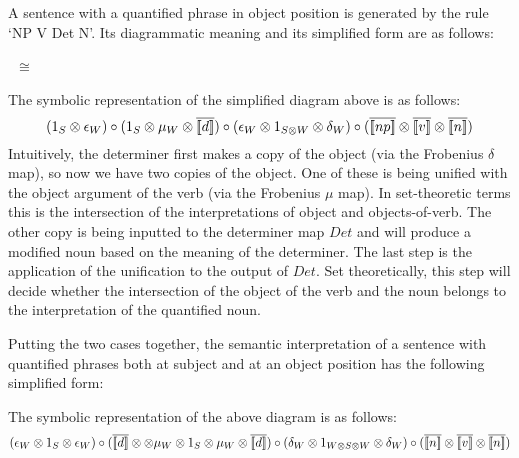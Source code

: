 A sentence with a  quantified phrase in  object position is generated by the rule   `NP V Det N'. Its diagrammatic meaning   and its simplified form are as follows:



\begin{minipage}{20cm}
\begin{minipage}{7cm}
\end{minipage}
\ $\cong$ \ \qquad
\begin{minipage}{5cm}
\end{minipage}
\end{minipage}


\noindent
The symbolic representation of the simplified  diagram above is as follows:
\[
(1_S \otimes \epsilon_W) \circ (1_S \otimes \mu_W \otimes \overline{\semantics{d}}) \circ (\epsilon_W \otimes 1_{S \otimes W} \otimes \delta_W) \circ (\overline{\semantics{np}} \otimes \overline{\semantics{v}} \otimes \overline{\semantics{n}})
\]
Intuitively,   the determiner first makes a copy of the object (via the Frobenius $\delta$ map), so now we have two copies of the object. One of these is being unified with the object argument of the verb (via the Frobenius $\mu$ map). In set-theoretic terms this is the intersection of the interpretations of object and objects-of-verb. The other copy is being inputted to the determiner map $Det$ and will produce a modified noun based on the meaning of the determiner.  The last step is the application of the unification to the output of $Det$. Set theoretically, this step will decide whether the intersection of the object of the verb and the noun belongs to the interpretation of the quantified noun. 


Putting the two cases together, the semantic interpretation  of a sentence with  quantified phrases both at subject and at an object position  has the following simplified form:


\begin{center}
\begin{minipage}{7cm}
\end{minipage}
\end{center}

\noindent
The symbolic representation of the above diagram is as follows:
\[{\small
(\epsilon_W \otimes 1_S \otimes \epsilon_W) \circ (\overline{\semantics{d}} \otimes  \otimes \mu_W \otimes 1_S \otimes \mu_W \otimes \overline{\semantics{d}}) \circ (\delta_W \otimes 1_{W \otimes S \otimes W} \otimes \delta_W)} \circ (\overline{\semantics{n}} \otimes \overline{\semantics{v}} \otimes \overline{\semantics{n}})
\]


